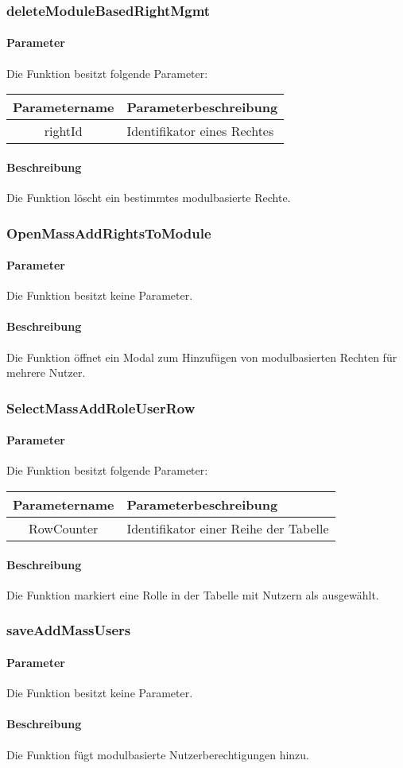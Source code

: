 \subsubsection{deleteModuleBasedRightMgmt}
\paragraph{Parameter} Die Funktion besitzt folgende Parameter:
\begin{table}[H]
	\begin{tabular}{|c|p{11cm}|}
		\hline
		\textbf{Parametername} & \textbf{Parameterbeschreibung} \\ \hline
		rightId & Identifikator eines Rechtes \\ \hline
	\end{tabular}
\end{table}
\paragraph{Beschreibung} Die Funktion löscht ein bestimmtes modulbasierte Rechte.
\subsubsection{OpenMassAddRightsToModule}
\paragraph{Parameter} Die Funktion besitzt keine Parameter.
\paragraph{Beschreibung} Die Funktion öffnet ein Modal zum Hinzufügen von modulbasierten Rechten für mehrere Nutzer.
\subsubsection{SelectMassAddRoleUserRow}
\paragraph{Parameter} Die Funktion besitzt folgende Parameter:
\begin{table}[H]
	\begin{tabular}{|c|p{11cm}|}
		\hline
		\textbf{Parametername} & \textbf{Parameterbeschreibung} \\ \hline
		RowCounter & Identifikator einer Reihe der Tabelle \\ \hline
	\end{tabular}
\end{table}
\paragraph{Beschreibung} Die Funktion markiert eine Rolle in der Tabelle mit Nutzern als ausgewählt.
\subsubsection{saveAddMassUsers}
\paragraph{Parameter} Die Funktion besitzt keine Parameter.
\paragraph{Beschreibung} Die Funktion fügt modulbasierte Nutzerberechtigungen hinzu.